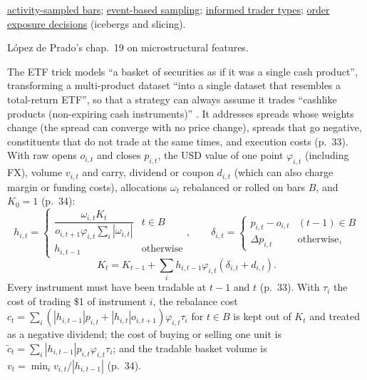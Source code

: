 \begin{qfmethod}
 \hyperref[meth:activity-sampled-bars]{activity-sampled bars}; \hyperref[meth:event-based-sampling]{event-based sampling}; \hyperref[def:informed-trader-types]{informed trader types}; \hyperref[def:order-exposure-decisions]{order exposure decisions} (icebergs and slicing).

 López de Prado's chap.~19 on microstructural features.

\end{qfmethod}

\begin{qfmethod}\label{meth:etf-trick}
 The ETF trick models ``a basket of securities as if it was a single cash product'', transforming a multi-product dataset ``into a single dataset that resembles a total-return ETF'', so that a strategy can always assume it trades ``cashlike products (non-expiring cash instruments)'' \citep[chap.~2, secs.~2.4--2.4.1, pp.~32--33]{alpha-afml}. It addresses spreads whose weights change (the spread can converge with no price change), spreads that go negative, constituents that do not trade at the same times, and execution costs (p.~33). With raw opens $o_{i,t}$ and closes $p_{i,t}$, the USD value of one point $\varphi_{i,t}$ (including FX), volume $v_{i,t}$ and carry, dividend or coupon $d_{i,t}$ (which can also charge margin or funding costs), allocations $\omega_t$ rebalanced or rolled on bars $B$, and $K_0=1$ (p.~34):
\[ h_{i,t}=\begin{cases}\dfrac{\omega_{i,t}K_t}{o_{i,t+1}\varphi_{i,t}\sum_i|\omega_{i,t}|}&t\in B\\ h_{i,t-1}&\text{otherwise}\end{cases},\qquad \delta_{i,t}=\begin{cases}p_{i,t}-o_{i,t}&(t-1)\in B\\ \Delta p_{i,t}&\text{otherwise,}\end{cases} \]
\[ K_t=K_{t-1}+\sum_ih_{i,t-1}\varphi_{i,t}(\delta_{i,t}+d_{i,t}). \]
Every instrument must have been tradable at $t-1$ and $t$ (p.~33). With $\tau_i$ the cost of trading \$1 of instrument $i$, the rebalance cost $c_t=\sum_i(|h_{i,t-1}|p_{i,t}+|h_{i,t}|o_{i,t+1})\varphi_{i,t}\tau_i$ for $t\in B$ is kept out of $K_t$ and treated as a negative dividend; the cost of buying or selling one unit is $\tilde c_t=\sum_i|h_{i,t-1}|p_{i,t}\varphi_{i,t}\tau_i$; and the tradable basket volume is $v_t=\min_i v_{i,t}/|h_{i,t-1}|$ (p.~34).


\end{qfmethod}
